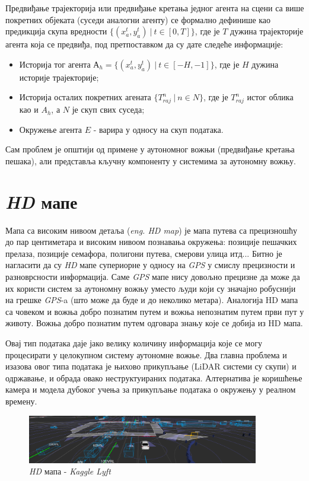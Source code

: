 \documentclass[11pt,oneside]{memoir}
\begin{document}
Предвиђање трајекторија или предвиђање кретања једног агента на сцени са више покретних објеката (суседи аналогни агенту) се формално
дефинише као предикција скупа вредности $\{(x^{t}_a, y^{t}_a)\ |\ t \in [0, T]\}$, где је $T$ дужина трајекторије агента која се предвиђа, 
под претпоставком да су дате следеће информације:
\begin{itemize}
  \item Историја тог агента $А_{h} = \{(x^{t}_a, y^{t}_a)\ |\ t \in [-H, -1]\}$, где је $H$ дужина историје трајекторије;
  \item Историја осталих покретних агената $\{T^{n}_{raj}\ |\ n \in N\}$, где је $T^{n}_{raj}$ истог облика као и $A_{h}$, а $N$ је скуп
        свих суседа;
  \item Окружење агента $E$ - варира у односу на скуп података.
\end{itemize}

Сам проблем је општији од примене у аутономног вожњи (предвиђање кретања пешака), али представља кључну компоненту у системима за
аутономну вожњу.

\section{\textit{HD} мапе}

Мапа са високим нивоом детаља (\textit{eng. HD map}) је мапа путева са прецизношћу до пар центиметара и високим нивоом
познавања окружења: позиције пешачких прелаза, позиције семафора, полигони путева, смерови улица итд... Битно је нагласити
да су \textit{HD} мапе супериорне у односу на \textit{GPS} у смислу прецизности и разноврсности информација. Саме \textit{GPS}
мапе нису довољно прецизне да може да их користи систем за аутономну вожњу уместо људи који су значајно робуснији на грешке
\textit{GPS}-a (што може да буде и до неколико метара). Аналогија HD мапа са човеком и вожња добро познатим путем и вожња 
непознатим путем први пут у животу. Вожња добро познатим путем одговара знању које се добија из HD мапа. 


Овај тип података даје јако велику количину информација које се могу процесирати у целокупном систему аутономне вожње. Два главна проблема
и изазова овог типа података је њихово прикупљање (LiDAR системи су скупи) и одржавање, и обрада овако неструктуираних података. Алтернатива
је коришћење камера и модела дубоког учења за прикупљање података о окружењу у реалном времену.

\begin{figure}[h!]
  \centering
  \includegraphics[width=0.9\textwidth]{images/lyft-hd-map.png}
  \caption{\textit{HD} мапа - \textit{Kaggle Lyft} \cite{kaggle_lyft} \label{kaggle-lyft-example}}
\end{figure}
\end{document}
